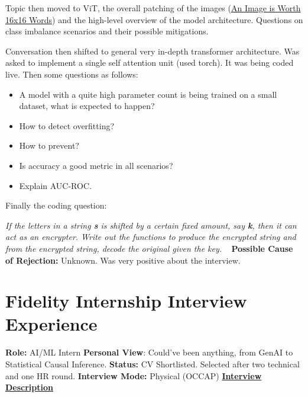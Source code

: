 \documentclass[12pt]{article}
\begin{document}
Topic then moved to ViT, the overall patching of the images (\href{https://arxiv.org/abs/2010.11929}{An Image is Worth 16x16 Words}) and the high-level overview of the model architecture. Questions on class imbalance scenarios and their possible mitigations. 

Conversation then shifted to general very in-depth transformer architecture. Was asked to implement a single self attention unit (used torch). It was being coded live.
\newline
Then some questions as follows:
 \begin{itemize}
    \item A model with a quite high parameter count is being trained on a small dataset, what is expected to happen?
    \item How to detect overfitting?
    \item How to prevent? 
    \item Is accuracy a good metric in all scenarios?
    \item Explain AUC-ROC.
 \end{itemize}

Finally the coding question:

\textit{If the letters in a string \textbf{s} is shifted by a certain fixed amount, say \textbf{k}, then it can act as an encrypter. Write out the functions to produce the encrypted string and from the encrypted string, decode the original given the key.}
\newline
\vspace{1pt}\
\newline
\textbf{Possible Cause of Rejection:} Unknown. Was very positive about the interview.


\section{Fidelity Internship Interview Experience}



\textbf{Role:} AI/ML Intern
\newline
\textbf{Personal View}: Could've been anything, from GenAI to Statistical Causal Inference.
\newline
\textbf{Status:} CV Shortlisted. Selected after two technical and one HR round.
\newline
\textbf{Interview Mode:} Physical (OCCAP)
\vspace{10pt}
\newline
\underline{\textbf{Interview Description}}
\newline
\end{document}
